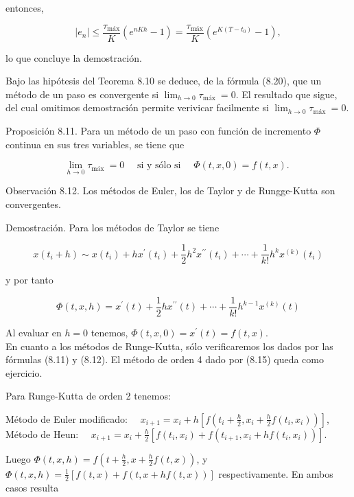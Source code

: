 \documentclass[10pt]{book}
\begin{document}
entonces,

$$
\left|e_{n}\right| \leq \frac{\tau_{\operatorname{máx}}}{K}\left(e^{n K h}-1\right)=\frac{\tau_{\operatorname{máx}}}{K}\left(e^{K\left(T-t_{0}\right)}-1\right),
$$

lo que concluye la demostración.

Bajo las hipótesis del Teorema 8.10 se deduce, de la fórmula (8.20), que un método de un paso es convergente si $\lim _{h \rightarrow 0} \tau_{\text {máx }}=0$. El resultado que sigue, del cual omitimos demostración permite verivicar facilmente si $\lim _{h \rightarrow 0} \tau_{\text {máx }}=0$.

Proposición 8.11. Para un método de un paso con función de incremento $\Phi$ continua en sus tres variables, se tiene que

$$
\lim _{h \rightarrow 0} \tau_{\text {máx }}=0 \quad \text { si y sólo si } \quad \Phi(t, x, 0)=f(t, x) \text {. }
$$

Observación 8.12. Los métodos de Euler, los de Taylor y de Rungge-Kutta son convergentes.

Demostración. Para los métodos de Taylor se tiene

$$
x\left(t_{i}+h\right) \sim x\left(t_{i}\right)+h x^{\prime}\left(t_{i}\right)+\frac{1}{2} h^{2} x^{\prime \prime}\left(t_{i}\right)+\cdots+\frac{1}{k!} h^{k} x^{(k)}\left(t_{i}\right)
$$

y por tanto

$$
\Phi(t, x, h)=x^{\prime}(t)+\frac{1}{2} h x^{\prime \prime}(t)+\cdots+\frac{1}{k!} h^{k-1} x^{(k)}(t)
$$

Al evaluar en $h=0$ tenemos, $\Phi(t, x, 0)=x^{\prime}(t)=f(t, x)$.\\
En cuanto a los métodos de Runge-Kutta, sólo verificaremos los dados por las fórmulas (8.11) y (8.12). El método de orden 4 dado por (8.15) queda como ejercicio.

Para Runge-Kutta de orden 2 tenemos:

Método de Euler modificado: $\quad x_{i+1}=x_{i}+h\left[f\left(t_{i}+\frac{h}{2}, x_{i}+\frac{h}{2} f\left(t_{i}, x_{i}\right)\right)\right]$,\\
Método de Heun: $\quad x_{i+1}=x_{i}+\frac{h}{2}\left[f\left(t_{i}, x_{i}\right)+f\left(t_{i+1}, x_{i}+h f\left(t_{i}, x_{i}\right)\right)\right]$.

Luego $\Phi(t, x, h)=f\left(t+\frac{h}{2}, x+\frac{h}{2} f(t, x)\right)$, y $\Phi(t, x, h)=\frac{1}{2}[f(t, x)+f(t, x+h f(t, x))]$ respectivamente. En ambos casos resulta
\end{document}
